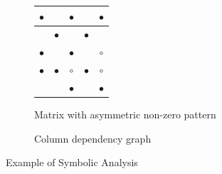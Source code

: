 \begin{figure}[h]
    \centering
    \begin{subfigure}[b]{0.5\textwidth}
        \centering
        \begin{tabular}{|c|c|c|c|c|}
        \hline
        \cellcolor{gray!80} $\bullet$   &                               &         $\bullet$            &                               &         $\bullet$     \\ 
        \hline
        \cellcolor{gray!80}             & \cellcolor{gray!80} $\bullet$ &                               &      $\bullet$                &                     \\ 
        \hline
        \cellcolor{gray!80} $\bullet$   & \cellcolor{gray!80}           & \cellcolor{gray!80} $\bullet$ &                               &          $\circ$    \\ 
        \hline
        \cellcolor{gray!80} $\bullet$   & \cellcolor{gray!80} $\bullet$ & \cellcolor{gray!80} $\circ$   & \cellcolor{gray!80} $\bullet$ &         $\circ$           \\ 
        \hline
        \cellcolor{gray!80}             & \cellcolor{gray!80}           & \cellcolor{gray!80} $\bullet$ & \cellcolor{gray!80}           & \cellcolor{gray!80} $\bullet$ \\ 
        \hline
        \end{tabular}
        \caption{Matrix with asymmetric non-zero pattern}
        \label{fig:sym:exampleMat}
    \end{subfigure}%
    \begin{subfigure}[b]{.5\textwidth}
        \centering
        \caption{Column dependency graph}
        \label{fig:sym:colDepGraph}
    \end{subfigure}
    \caption{Example of Symbolic Analysis}
    \label{fig:sym:example}
\end{figure}

